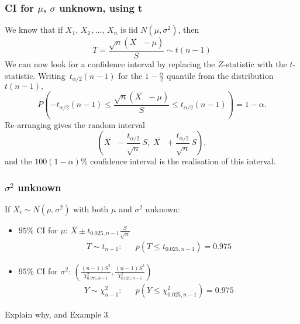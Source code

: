 \documentclass[xcolor=dvipsnames]{beamer}
\begin{document}
\begin{frame}
\frametitle{CI for $\mu$, $\sigma$ unknown, using t}

We know that if $X_{1},\,X_{2\,},\ldots,\,X_{n}$ is iid $N(\mu,\sigma^{2})$, then
\[
T=\frac{\sqrt{n}\left(  \overline{X\text{ }}-\mu\right)  }{S}\sim t\left(
n-1\right)
\]
We can now look for a confidence interval by replacing the $Z$-statistic with
the $t$-statistic. \smallskip Writing\ $t_{\alpha/2}\left(  n-1\right)  $ for
the $1-\frac{\alpha}{2}$ quantile from the distribution $t(n-1),$%
\[
P\left(  -t_{\alpha/2}\left(  n-1\right)  \le \frac{\sqrt{n}\left(
\overline{X\text{ }}-\mu\right)  }{S} \le t_{\alpha/2}\left(  n-1\right)  \right)
=1-\alpha.
\]
Re-arranging gives the random interval
\[
\left(  \overline{X\text{ }}-\frac{t_{\alpha/2}}{\sqrt{n}}\,S,\;\overline
{X\text{ }}+\frac{t_{\alpha/2}}{\sqrt{n}}\,S\right)  ,
\]
and the $100\left(  1-\alpha\right)  \%$ confidence interval is the
realisation of this interval.
\end{frame}

\begin{frame}
\frametitle{$\sigma^2$ unknown}
\par If $X_i\sim N(\mu,\sigma^2)$ with both $\mu$ and $\sigma^2$ unknown:\\
\begin{itemize}
\item $95\%$ CI for $\mu$: ${\bar X}\pm t_{0.025,n-1}\frac{S}{\sqrt{n}}$\\
\begin{eqnarray*}
 T\sim t_{n-1}: && p(T\le t_{0.025,n-1})=0.975
\end{eqnarray*}

\item $95\%$ CI for $\sigma^2$: $\left(\frac{(n-1)S^2}{\chi^2_{0.975,n-1}},\frac{(n-1)S^2}{\chi^2_{0.025,n-1}}\right)$\\
\begin{eqnarray*}
 Y\sim \chi^2_{n-1}: && p(Y\le \chi^2_{0.025,n-1})=0.975
\end{eqnarray*}

\end{itemize}
\par{} Explain why, and Example 3.
\end{frame}
\end{document}
